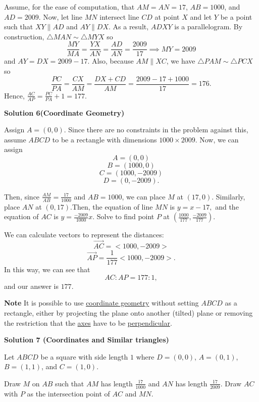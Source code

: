 \begin{enumerate}
Assume, for the ease of computation, that $AM=AN=17$, $AB=1000$, and $AD=2009$.  Now, let line $MN$ intersect line $CD$ at point $X$ and let $Y$ be a point such that $XY\parallel AD$ and $AY\parallel DX$.  As a result, $ADXY$ is a parallelogram.  By construction, $\triangle MAN\sim \triangle MYX$ so 
 \[\frac{MY}{MA}=\frac{YX}{AN}=\frac{AD}{AN}=\frac{2009}{17}\implies MY=2009\] and $AY=DX=2009-17$.  Also, because $AM\parallel XC$, we have $\triangle PAM\sim \triangle PCX$ so 
 \[\frac{PC}{PA}=\frac{CX}{AM}=\frac{DX+CD}{AM}=\frac{2009-17+1000}{17}=176.\]  Hence, $\frac{AC}{AP}=\frac{PC}{PA}+1=\boxed{177}.$




\textbf{Solution 6(Coordinate Geometry)}

Assign $A = (0,0)$. Since there are no constraints in the problem against this, assume $ABCD$ to be a rectangle with dimensions $1000 \times 2009.$ Now, we can assign 
 \[A=(0,0)\] 
 \[B=(1000, 0)\] 
 \[C=(1000,-2009)\] 
 \[D=(0,-2009).\]

 Then, since $\frac{AM}{AB} = \frac{17}{1000}$ and $AB = 1000$, we can place $M$ at $(17, 0).$ Similarly, place $AN$ at $(0, 17).$Then, the equation of line $MN$ is $y=x-17,$ and the equation of $AC$ is $y=\frac{-2009}{1000}x.$ Solve to find point $P$ at $\left( \frac{1000}{177}, \frac{-2009}{177} \right)$.

 We can calculate vectors to represent the distances: 
 \[\overrightarrow{AC}= <1000, -2009>\] 
 \[\overrightarrow{AP}= \frac{1}{177}<1000, -2009>.\] In this way, we can see that 
 \[AC:AP = 177:1,\] and our answer is $\boxed{177}.$

 \textbf{Note} It is possible to use \href{https://artofproblemsolving.com/wiki/index.php?title=Coordinate\_geometry}{coordinate geometry} without setting $ABCD$ as a rectangle, either by projecting the plane onto another (tilted) plane or removing the restriction that the \href{https://artofproblemsolving.com/wiki/index.php?title=Axes}{axes} have to be \href{https://artofproblemsolving.com/wiki/index.php?title=Perpendicular}{perpendicular}.

 



\textbf{Solution 7 (Coordinates and Similar triangles)}

Let $ABCD$ be a square with side length $1$ where $D = (0,0)$, $A = (0,1)$, $B = (1,1)$, and $C = (1,0)$.

 Draw $M$ on $AB$ such that $AM$ has length $\frac{17}{1000}$ and $AN$ has length $\frac{17}{2009}$. Draw $AC$ with $P$ as the intersection point of $AC$ and $MN$.


\end{enumerate}
